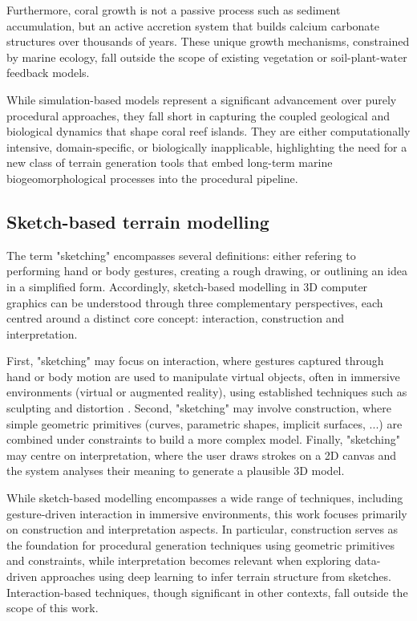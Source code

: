 Furthermore, coral growth is not a passive process such as sediment accumulation, but an active accretion system that builds calcium carbonate structures over thousands of years. These unique growth mechanisms, constrained by marine ecology, fall outside the scope of existing vegetation or soil-plant-water feedback models.

\midConclusion

While simulation-based models represent a significant advancement over purely procedural approaches, they fall short in capturing the coupled geological and biological dynamics that shape coral reef islands. They are either computationally intensive, domain-specific, or biologically inapplicable, highlighting the need for a new class of terrain generation tools that embed long-term marine biogeomorphological processes into the procedural pipeline.


\subsection{Sketch-based terrain modelling}
\label{sec:coral-island-sota-sketches}

The term "sketching" encompasses several definitions: either refering to performing hand or body gestures, creating a rough drawing, or outlining an idea in a simplified form. Accordingly, sketch-based modelling in 3D computer graphics can be understood through three complementary perspectives, each centred around a distinct core concept: interaction, construction and interpretation.

First, "sketching" may focus on interaction, where gestures captured through hand or body motion are used to manipulate virtual objects, often in immersive environments (virtual or augmented reality), using established techniques such as sculpting and distortion \cite{Olsen2009, Cook2009}. Second, "sketching" may involve construction, where simple geometric primitives (curves, parametric shapes, implicit surfaces, ...) are combined under constraints to build a more complex model. Finally, "sketching" may centre on interpretation, where the user draws strokes on a 2D canvas and the system analyses their meaning to generate a plausible 3D model.

While sketch-based modelling encompasses a wide range of techniques, including gesture-driven interaction in immersive environments, this work focuses primarily on construction and interpretation aspects. In particular, construction serves as the foundation for procedural generation techniques using geometric primitives and constraints, while interpretation becomes relevant when exploring data-driven approaches using deep learning to infer terrain structure from sketches. Interaction-based techniques, though significant in other contexts, fall outside the scope of this work.

